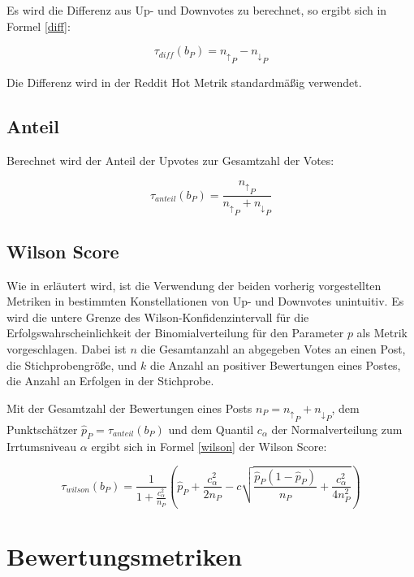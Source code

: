 Es wird die Differenz aus Up- und Downvotes zu berechnet, so ergibt sich in Formel \ref{diff}:

\begin{equation}
\label{diff}
\tau_{diff}(b_P) = {n_\uparrow}_P - {n_\downarrow}_P
\end{equation}

Die Differenz wird in der Reddit Hot Metrik standardmäßig verwendet.

\subsection{Anteil}

Berechnet wird der Anteil der Upvotes zur Gesamtzahl der Votes:

\begin{equation}
\label{anteil}
\tau_{anteil}(b_P) = \frac{{n_\uparrow}_P}{{n_\uparrow}_P + {n_\downarrow}_P}
\end{equation}


\subsection{Wilson Score}

Wie in \cite{miller} erläutert wird, ist die Verwendung der beiden vorherig vorgestellten Metriken in bestimmten Konstellationen von Up- und Downvotes unintuitiv. Es wird  die untere Grenze des Wilson-Konfidenzintervall für die Erfolgswahrscheinlichkeit der Binomialverteilung für den Parameter $p$ als Metrik vorgeschlagen. Dabei ist $n$ die Gesamtanzahl an abgegeben Votes an einen Post, die Stichprobengröße, und $k$ die Anzahl an positiver Bewertungen eines Postes, die Anzahl an Erfolgen in der Stichprobe.
	
Mit der Gesamtzahl der Bewertungen eines Posts $n_P = {n_\uparrow}_P + {n_\downarrow}_P$, dem Punktschätzer $\hat{p}_P = \tau_{anteil}(b_P)$ und dem Quantil $c_{\alpha}$ der Normalverteilung zum Irrtumsniveau $\alpha$ ergibt sich in Formel \ref{wilson} der Wilson Score:

\begin{equation}
\label{wilson}
 \tau_{wilson}(b_P) = \frac{1}{1+\frac{c_{\alpha}^2}{n_P}}(\hat{p}_P + \frac{c_{\alpha}^2}{2n_P} - c \sqrt{\frac{\hat{p}_P(1 - \hat{p}_P)}{n_P} + \frac{c_{\alpha}^2}{4n_P^2}})
\end{equation}
	
\section{Bewertungsmetriken}

